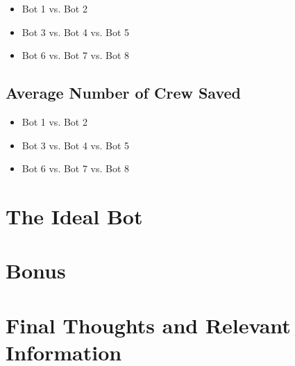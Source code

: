 \documentclass[11pt]{article}
\begin{document}
\begin{itemize}
    \item Bot 1 vs. Bot 2
    \item Bot 3 vs. Bot 4 vs. Bot 5
    \item Bot 6 vs. Bot 7 vs. Bot 8
\end{itemize}

\subsection{Average Number of Crew Saved}

\begin{itemize}
    \item Bot 1 vs. Bot 2
    \item Bot 3 vs. Bot 4 vs. Bot 5
    \item Bot 6 vs. Bot 7 vs. Bot 8
\end{itemize}


\section{The Ideal Bot}



\section{Bonus}



\section{Final Thoughts and Relevant Information}
\end{document}
